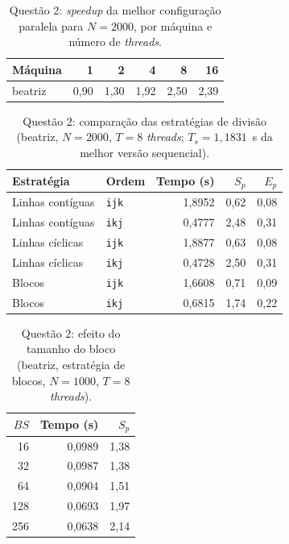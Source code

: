 \begin{table}[H]
\centering
\small
\caption{Questão 2: \textit{speedup} da melhor configuração paralela para $N=2000$, por máquina e número de \textit{threads}.}
\label{tab:q2-speedup}
\begin{tabular}{lrrrrr}
\toprule
\textbf{Máquina} & \textbf{1} & \textbf{2} & \textbf{4} & \textbf{8} & \textbf{16} \\
\midrule
beatriz & 0,90 & 1,30 & 1,92 & 2,50 & 2,39 \\
\bottomrule
\end{tabular}
\end{table}

\begin{table}[H]
\centering
\small
\caption{Questão 2: comparação das estratégias de divisão (beatriz, $N=2000$, $T=8$ \textit{threads}; $T_s=1,1831$~s da melhor versão sequencial).}
\label{tab:q2-estrategias-beatriz}
\begin{tabular}{llrrr}
\toprule
\textbf{Estratégia} & \textbf{Ordem} & \textbf{Tempo (s)} & \textbf{$S_p$} & \textbf{$E_p$} \\
\midrule
Linhas contíguas & \texttt{ijk} & 1,8952 & 0,62 & 0,08 \\
Linhas contíguas & \texttt{ikj} & 0,4777 & 2,48 & 0,31 \\
Linhas cíclicas & \texttt{ijk} & 1,8877 & 0,63 & 0,08 \\
Linhas cíclicas & \texttt{ikj} & 0,4728 & 2,50 & 0,31 \\
Blocos & \texttt{ijk} & 1,6608 & 0,71 & 0,09 \\
Blocos & \texttt{ikj} & 0,6815 & 1,74 & 0,22 \\
\bottomrule
\end{tabular}
\end{table}

\begin{table}[H]
\centering
\small
\caption{Questão 2: efeito do tamanho do bloco (beatriz, estratégia de blocos, $N=1000$, $T=8$ \textit{threads}).}
\label{tab:q2-blocos-beatriz}
\begin{tabular}{rrr}
\toprule
\textbf{$BS$} & \textbf{Tempo (s)} & \textbf{$S_p$} \\
\midrule
16 & 0,0989 & 1,38 \\
32 & 0,0987 & 1,38 \\
64 & 0,0904 & 1,51 \\
128 & 0,0693 & 1,97 \\
256 & 0,0638 & 2,14 \\
\bottomrule
\end{tabular}
\end{table}
